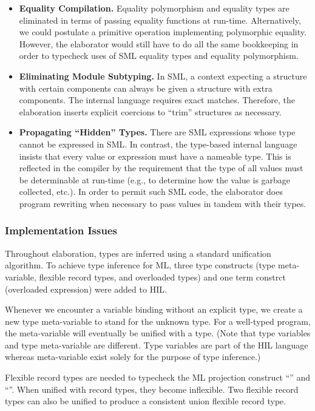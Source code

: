 \documentclass[12pt,twoside]{article}
\begin{document}
\begin{itemize}
\item \textbf{Equality Compilation. } Equality polymorphism and
equality types are eliminated in terms of passing equality functions
at run-time.  Alternatively, we could postulate a primitive operation
implementing polymorphic equality.  However, the elaborator would
still have to do all the same bookkeeping in order to typecheck uses
of SML equality types and equality polymorphism.

\item \textbf{Eliminating Module Subtyping. } In SML, a context
expecting a structure with certain components can always be given a
structure with extra components.  The internal language requires
exact matches.  Therefore, the elaboration inserts explicit coercions to
``trim'' structures as necessary.

\item \textbf{Propagating ``Hidden'' Types. }  There are
SML expressions whose type cannot be expressed in SML.  In
contrast, the type-based internal language insists that every value or
expression must have a nameable type.  This is reflected in the
compiler by the requirement that the type of all values must be
determinable at run-time (e.g., to determine how the value is garbage
collected, etc.).  In order to permit such SML code, the elaborator
does program rewriting when necessary to pass values in tandem with
their types.
\end{itemize}

\subsubsection{Implementation Issues}

Throughout elaboration, types are inferred using a standard
unification algorithm.  To achieve type inference for ML, three type
constructs (type meta-variable, flexible record types, and overloaded
types) and one term constrct (overloaded expression) were added to
HIL.

Whenever we encounter a variable binding without an explicit type, we
create a new type meta-variable to stand for the unknown type.  For a
well-typed program, the meta-variable will eventually be unified with
a type.  (Note that type variables and type meta-variable are
different.  Type variables are part of the HIL language whereas
meta-variable exist solely for the purpose of type inference.)

Flexible record types are needed to typecheck the ML projection
construct ``\cd{\#}'' and ``''.  When unified with record
types, they become inflexible.  Two flexible record types can also be
unified to produce a consistent union flexible record type.
\end{document}
